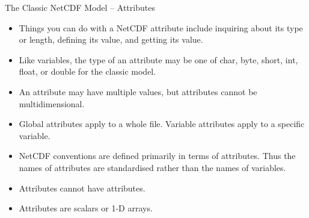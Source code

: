 \documentclass[compress,11pt,xcolor=svgnames,aspectratio=169]{beamer}
\begin{document}
\begin{frame}[fragile]{The Classic NetCDF Model -- Attributes}

\begin{itemize}
\setlength\itemsep{0.2cm}

  \item Things you can do with a NetCDF attribute include inquiring about its type or length, defining its value, and getting its value.
  \item Like variables, the type of an attribute may be one of char, byte, short, int, float, or double for the classic model.
  \item An attribute may have multiple values, but attributes cannot be multidimensional.
  \item Global attributes apply to a whole file. Variable attributes apply to a specific variable.
  \item NetCDF conventions are defined primarily in terms of attributes. Thus the names of attributes are standardised rather than the names of variables.
  \item Attributes cannot have attributes.
  \item Attributes are scalars or 1-D arrays.

\end{itemize}

\nocite{netcdf}

\end{frame}
\end{document}
